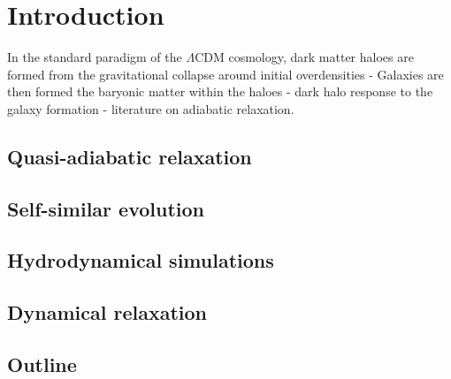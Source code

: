 \chapter{Introduction}
\label{chap:intro}
In the standard paradigm of the $\Lambda$CDM cosmology, dark matter haloes are formed from the gravitational collapse around initial overdensities - Galaxies are then formed the baryonic matter within the haloes - dark halo response to the galaxy formation - literature on adiabatic relaxation.


\section{Quasi-adiabatic relaxation}

\section{Self-similar evolution}
\cite{2015LauNagaietal}

\section{Hydrodynamical simulations}

\section{Dynamical relaxation}

\section{Outline}
